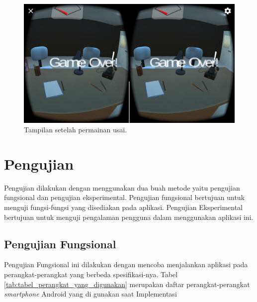 \begin{enumerate}
    \begin{figure}[htbp]
    \centering
    \includegraphics[scale=0.23]{Gambar/screenshot-aplikasi/game-over.png}
    \caption{Tampilan setelah permainan usai.}
    \label{fig:ss_game_over}
    \end{figure}
    
\end{enumerate}

\section{Pengujian}

Pengujian dilakukan dengan menggunakan dua buah metode yaitu pengujian fungsional dan pengujian eksperimental. Pengujian fungsional bertujuan untuk menguji fungsi-fungsi yang disediakan pada aplikasi. Pengujian Eksperimental bertujuan untuk menguji pengalaman pengguna dalam menggunakan aplikasi ini.

\subsection{Pengujian Fungsional}

Pengujian Fungsional ini dilakukan dengan mencoba menjalankan aplikasi pada perangkat-perangkat yang berbeda spesifikasi-nya. Tabel \ref{tab:tabel_perangkat_yang_digunakan} merupakan daftar perangkat-perangkat \textit{smartphone} Android yang di gunakan saat Implementasi

